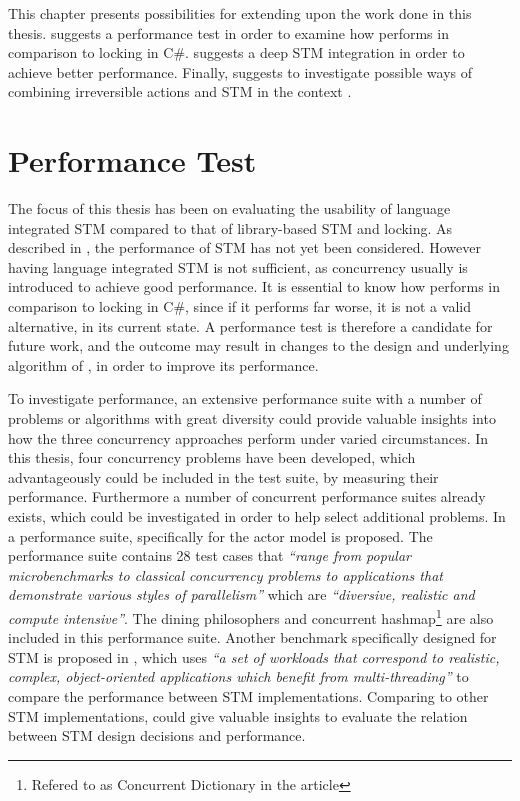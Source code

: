 \makeatletter {}\makeatother
{}
This chapter presents possibilities for extending upon the work done in this thesis.  suggests a performance test in order to examine how \stmname performs in comparison to locking in C\#.  suggests a deep \ac{STM} integration in order to achieve better performance. Finally,  suggests to investigate possible ways of combining  irreversible actions and \ac{STM} in the context \stmname.

\label{chap:future_work}
\section{Performance Test}\label{sec:fut_perf_test}
The focus of this thesis has been on evaluating the usability of language integrated \ac{STM} compared to that of library-based \ac{STM} and locking. As described in , the performance of \ac{STM} has not yet been considered. However having language integrated \ac{STM} is not sufficient, as concurrency usually is introduced to achieve good performance. It is essential to know how \stmname performs in comparison to locking in C\#, since if it performs far worse, it is not a valid alternative, in its current state. A performance test is therefore a candidate for future work, and the outcome may result in changes to the design and underlying algorithm of \stmname, in order to improve its performance.

To investigate performance, an extensive performance suite with a number of problems or algorithms with great diversity could provide valuable insights into how the three concurrency approaches perform under varied circumstances. In this thesis, four concurrency problems have been developed, which advantageously could be included in the test suite, by measuring their performance. Furthermore a number of concurrent performance suites already exists, which could be investigated in order to help select additional problems. In \cite{imam2014savina} a performance suite, specifically for the actor model is proposed. The performance suite contains 28 test cases that \textit{``range from popular microbenchmarks to classical concurrency problems to applications that demonstrate various styles of parallelism''} which are \textit{``diversive, realistic and compute intensive''}. The dining philosophers and concurrent hashmap\footnote{Refered to as Concurrent Dictionary in the article} are also included in this performance suite. Another benchmark specifically designed for \ac{STM} is proposed in \cite{guerraoui2006stmbench7}, which uses \textit{``a set of workloads that correspond to realistic, complex, object-oriented applications which benefit from multi-threading''} to compare the performance between \ac{STM} implementations. Comparing \stmname to other \ac{STM} implementations, could give valuable insights to evaluate the relation between \ac{STM} design decisions and performance.

